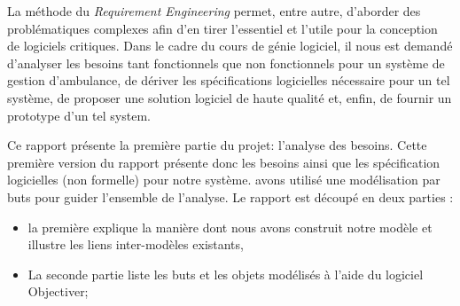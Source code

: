 La méthode du \textit{Requirement Engineering} permet, entre autre, 
d'aborder des problématiques complexes afin d'en tirer l'essentiel et l'utile pour la 
conception de logiciels critiques. Dans le cadre du cours de génie logiciel, il
nous est demandé d'analyser les besoins tant fonctionnels que non fonctionnels
pour un système de gestion d'ambulance, de dériver les spécifications
logicielles nécessaire pour un tel système, de proposer une solution logiciel
de haute qualité et, enfin, de fournir un prototype d'un tel system.

Ce rapport présente la première partie du projet: l'analyse des besoins. 
Cette première version du rapport présente donc les besoins ainsi que les 
spécification logicielles (non formelle) pour notre système.
avons utilisé une modélisation par buts pour guider l'ensemble de l'analyse.
Le rapport est découpé en deux parties : 
\begin{itemize}
	\item la première explique la manière
		  dont nous avons construit notre modèle et illustre les liens inter-modèles
		  existants,
	\item La seconde partie liste les buts et les objets modélisés à l'aide
		  du logiciel Objectiver;
\end{itemize}
